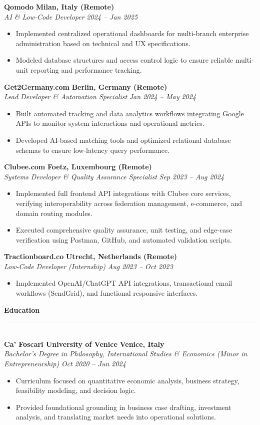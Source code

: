 \documentclass[10pt,a4paper]{article}
\newcommand{\cvsection}[1]{%
  \vspace{6pt}%
  {\large\bfseries\color{primary}#1}\\[-3pt]%
  {\color{linegray}\rule{\textwidth}{0.75pt}}\\[3pt]%
}
\newcommand{\cventry}[4]{%
  \textbf{#1} \hfill \textbf{\color{secondary}#2}\\
  \textit{\color{secondary}#3} \hfill \textit{\color{secondary}#4}\\[2pt]
}
\begin{document}
\vspace{2pt}
\cventry{Qomodo}{Milan, Italy (Remote)}{AI \& Low-Code Developer}{2024 -- Jan 2025}
\begin{itemize}
  \item Implemented centralized operational dashboards for multi-branch enterprise administration based on technical and UX specifications.
  \item Modeled database structures and access control logic to ensure reliable multi-unit reporting and performance tracking.
\end{itemize}

\vspace{2pt}
\cventry{Get2Germany.com}{Berlin, Germany (Remote)}{Lead Developer \& Automation Specialist}{Jan 2024 -- May 2024}
\begin{itemize}
  \item Built automated tracking and data analytics workflows integrating Google APIs to monitor system interactions and operational metrics.
  \item Developed AI-based matching tools and optimized relational database schemas to ensure low-latency query performance.
\end{itemize}

\vspace{2pt}
\cventry{Clubee.com}{Foetz, Luxembourg (Remote)}{Systems Developer \& Quality Assurance Specialist}{Sep 2023 -- Aug 2024}
\begin{itemize}
  \item Implemented full frontend API integrations with Clubee core services, verifying interoperability across federation management, e-commerce, and domain routing modules.
  \item Executed comprehensive quality assurance, unit testing, and edge-case verification using Postman, GitHub, and automated validation scripts.
\end{itemize}

\vspace{2pt}
\cventry{Tractionboard.co}{Utrecht, Netherlands (Remote)}{Low-Code Developer (Internship)}{Aug 2023 -- Oct 2023}
\begin{itemize}
  \item Implemented OpenAI/ChatGPT API integrations, transactional email workflows (SendGrid), and functional responsive interfaces.
\end{itemize}

\cvsection{Education}
\cventry{Ca' Foscari University of Venice}{Venice, Italy}{Bachelor's Degree in Philosophy, International Studies \& Economics (Minor in Entrepreneurship)}{Oct 2020 -- Jun 2024}
\begin{itemize}
  \item Curriculum focused on quantitative economic analysis, business strategy, feasibility modeling, and decision logic.
  \item Provided foundational grounding in business case drafting, investment analysis, and translating market needs into operational solutions.
\end{itemize}
\end{document}
